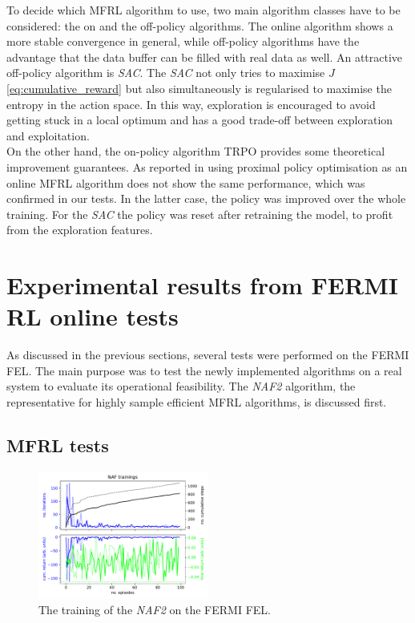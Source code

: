 \documentclass[
reprint,
amsmath,amssymb,amsfonts,clevref,
aps,
prstab,
]{revtex4-2}
\begin{document}
To decide which MFRL algorithm to use, two main algorithm classes have to be considered: the on and the off-policy algorithms. The online algorithm shows a more stable convergence in general, while off-policy algorithms have the advantage that the data buffer can be filled with real data as well. An attractive off-policy algorithm is \emph{SAC}. The \emph{SAC} not only tries to maximise $J$ \cref{eq:cumulative_reward} but also simultaneously is regularised to maximise the entropy in the action space. In this way, exploration is encouraged to avoid getting stuck in a local optimum and has a good trade-off between exploration and exploitation.\\
On the other hand, the on-policy algorithm TRPO provides some theoretical improvement guarantees. As reported in \cite{Kurutach2018} using proximal policy optimisation \cite{Schulman2017} as an online MFRL algorithm does not show the same performance, which was confirmed in our tests. In the latter case, the policy was improved over the whole training. For the \emph{SAC} the policy was reset after retraining the model, to profit from the exploration features.
	\section{Experimental results from FERMI RL online tests}
	As discussed in the previous sections, several tests were performed on the FERMI FEL.
	The main purpose was to test the newly implemented algorithms on a real system to evaluate its operational feasibility. The \emph{NAF2} algorithm, the representative for highly sample efficient MFRL algorithms, is discussed first.
	\subsection{MFRL tests}
		\begin{figure}
		\centering
		\includegraphics*[width=0.5\textwidth]{Figures/FERMI_all_experiments_NAF_training_episodes.pdf}
		\caption{The training of the \emph{NAF2} on the FERMI FEL.}
		\label{fig:NAF_training}
	\end{figure}
	
\end{document}
